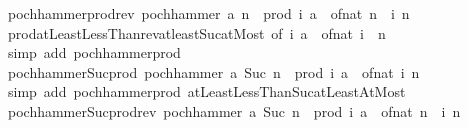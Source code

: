 \begin{isabellebody}
\isanewline
{}\isamarkupfalse%
\ pochhammer{\isacharunderscore}{\kern0pt}prod{\isacharunderscore}{\kern0pt}rev{\isacharcolon}{\kern0pt}\ {\isachardoublequoteopen}pochhammer\ a\ n\ {\isacharequal}{\kern0pt}\ prod\ {\isacharparenleft}{\kern0pt}{\isasymlambda}i{\isachardot}{\kern0pt}\ a\ {\isacharplus}{\kern0pt}\ of{\isacharunderscore}{\kern0pt}nat\ {\isacharparenleft}{\kern0pt}n\ {\isacharminus}{\kern0pt}\ i{\isacharparenright}{\kern0pt}{\isacharparenright}{\kern0pt}\ {\isacharbraceleft}{\kern0pt}{}{\isachardot}{\kern0pt}{\isachardot}{\kern0pt}n{\isacharbraceright}{\kern0pt}{\isachardoublequoteclose}\isanewline
%
\isadelimproof
\ \ %
\endisadelimproof
%
\isatagproof
{}\isamarkupfalse%
\ prod{\isachardot}{\kern0pt}atLeastLessThan{\isacharunderscore}{\kern0pt}rev{\isacharunderscore}{\kern0pt}at{\isacharunderscore}{\kern0pt}least{\isacharunderscore}{\kern0pt}Suc{\isacharunderscore}{\kern0pt}atMost\ {\isacharbrackleft}{\kern0pt}of\ {\isachardoublequoteopen}{\isasymlambda}i{\isachardot}{\kern0pt}\ a\ {\isacharplus}{\kern0pt}\ of{\isacharunderscore}{\kern0pt}nat\ i{\isachardoublequoteclose}\ {}\ n{\isacharbrackright}{\kern0pt}\isanewline
\ \ \isamarkupfalse%
\ {\isacharparenleft}{\kern0pt}simp\ add{\isacharcolon}{\kern0pt}\ pochhammer{\isacharunderscore}{\kern0pt}prod{\isacharparenright}{\kern0pt}%
\endisatagproof
{\isafoldproof}%
%
\isadelimproof
\isanewline
%
\endisadelimproof
\isanewline
{}\isamarkupfalse%
\ pochhammer{\isacharunderscore}{\kern0pt}Suc{\isacharunderscore}{\kern0pt}prod{\isacharcolon}{\kern0pt}\ {\isachardoublequoteopen}pochhammer\ a\ {\isacharparenleft}{\kern0pt}Suc\ n{\isacharparenright}{\kern0pt}\ {\isacharequal}{\kern0pt}\ prod\ {\isacharparenleft}{\kern0pt}{\isasymlambda}i{\isachardot}{\kern0pt}\ a\ {\isacharplus}{\kern0pt}\ of{\isacharunderscore}{\kern0pt}nat\ i{\isacharparenright}{\kern0pt}\ {\isacharbraceleft}{\kern0pt}{}{\isachardot}{\kern0pt}{\isachardot}{\kern0pt}n{\isacharbraceright}{\kern0pt}{\isachardoublequoteclose}\isanewline
%
\isadelimproof
\ \ %
\endisadelimproof
%
\isatagproof
{}\isamarkupfalse%
\ {\isacharparenleft}{\kern0pt}simp\ add{\isacharcolon}{\kern0pt}\ pochhammer{\isacharunderscore}{\kern0pt}prod\ atLeastLessThanSuc{\isacharunderscore}{\kern0pt}atLeastAtMost{\isacharparenright}{\kern0pt}%
\endisatagproof
{\isafoldproof}%
%
\isadelimproof
\isanewline
%
\endisadelimproof
\isanewline
{}\isamarkupfalse%
\ pochhammer{\isacharunderscore}{\kern0pt}Suc{\isacharunderscore}{\kern0pt}prod{\isacharunderscore}{\kern0pt}rev{\isacharcolon}{\kern0pt}\ {\isachardoublequoteopen}pochhammer\ a\ {\isacharparenleft}{\kern0pt}Suc\ n{\isacharparenright}{\kern0pt}\ {\isacharequal}{\kern0pt}\ prod\ {\isacharparenleft}{\kern0pt}{\isasymlambda}i{\isachardot}{\kern0pt}\ a\ {\isacharplus}{\kern0pt}\ of{\isacharunderscore}{\kern0pt}nat\ {\isacharparenleft}{\kern0pt}n\ {\isacharminus}{\kern0pt}\ i{\isacharparenright}{\kern0pt}{\isacharparenright}{\kern0pt}\ {\isacharbraceleft}{\kern0pt}{}{\isachardot}{\kern0pt}{\isachardot}{\kern0pt}n{\isacharbraceright}{\kern0pt}{\isachardoublequoteclose}\isanewline

\end{isabellebody}
